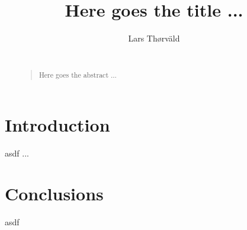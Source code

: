 \documentclass[a4paper,preprint]{sig-alternate-xt}
\begin{document}
\title{Here goes the title ...}


%
\author{
%
\alignauthor Lars Th{\o}rv{\"a}ld\\
       \\
}



\maketitle

\begin{abstract}
\begin{quote}
Here goes the abstract ... 
\end{quote}
\end{abstract}

\section{Introduction}
asdf ...


\cite{Spector90}


\section{Conclusions}
asdf



\end{document}
